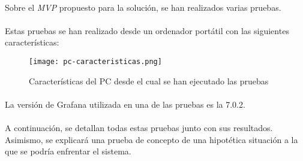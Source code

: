 \documentclass[../../memoria.tex]{subfiles}
\begin{document}
\paragraph{}
Sobre el \textit{MVP} propuesto para la solución, se han realizados varias pruebas.
\paragraph{}
Estas pruebas se han realizado desde un ordenador portátil con las siguientes características:

\begin{figure}[H]
    \centering
    \texttt{[image: pc-caracteristicas.png]}
    \caption{Características del PC desde el cual se han ejecutado las pruebas}
    \label{fig:pcCaracteristicas}
\end{figure}

\paragraph{}
La versión de Grafana \cite{grafana} utilizada en una de las pruebas es la 7.0.2.
\paragraph{}
A continuación, se detallan todas estas pruebas junto con sus resultados. Asimismo, se explicará una prueba de concepto de una hipotética situación a la que se podría enfrentar el sistema.
\end{document}
